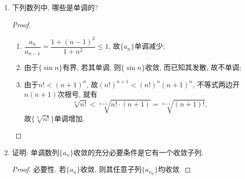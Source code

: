\documentclass[a4paper,11pt,twoside]{ctexbook}
\begin{document}
\begin{enumerate}
\begin{proof}
\begin{equation*}
\begin{split}
				      =&\left(\dfrac{2}{1^2}\right)\left(\dfrac{2\cdot4}{3^2}\right)\left(\dfrac{4\cdot6}{5^2}\right)\cdots\left(\dfrac{(2n-2)(2n)}{(2n-1)^2}\right)\cdot\dfrac{2n}{2n+1}\leqslant2.
			      \end{split}
		      \end{equation*}
		      其中用到了基本不等式$(2n-2)(2n)\leqslant\left(\dfrac{(2n-2)+(2n)}{2}\right)^2=(2n-1)^2$, 即$\dfrac{(2n-2)(2n)}{(2n-1)^2}\leqslant 1$, 于是$\{a_n\}$有上界; 又由
		      \[
			      \dfrac{a_n}{a_{n-1}}=\left(\dfrac{2n}{2n-1}\right)^2\dfrac{2n-1}{2n+1}=\dfrac{4n^2}{4n^2-1}\geqslant 1.
		      \]
		      故$\{a_n\}$单调增加. 由单调有界原理知$\{a_n\}$收敛.\qedhere

	      \end{proof}
	\item 下列数列中, 哪些是单调的?
	      \begin{tabenum}[(1)]
		      \item $\left\{\dfrac{1}{1+n^2}\right\}$; \item $\{\sin{n}\}$;	\item $\{\sqrt[n]{n!}\}$.
	      \end{tabenum}
	      \begin{proof}
		      \begin{enumerate}[(1)]
			      \item $\dfrac{a_n}{a_{n-1}}=\dfrac{1+(n-1)^2}{1+n^2}\leqslant 1$, 故$\{a_n\}$单调减少;
			      \item 由于$\{\sin{n}\}$有界, 若其单调, 则$\{\sin{n}\}$收敛, 而已知其发散, 故不单调;
			      \item 由于$n!<(n+1)^n$, 故$(n!)^{n+1}<(n!)^n(n+1)^n$, 不等式两边开$n(n+1)$次根号, 就有
			            \[
				            \sqrt[n]{n!}<\sqrt[n+1]{n!\cdot (n+1)}=\sqrt[n+1]{(n+1)!},
			            \]
			            故$\{\sqrt[n]{n!}\}$单调增加.\qedhere
		      \end{enumerate}
	      \end{proof}
	\item 证明: 单调数列$\{a_n\}$收敛的充分必要条件是它有一个收敛子列.
	      \begin{proof}
		      必要性. 若$\{a_n\}$收敛, 则其任意子列$\{a_{n_k}\}$均收敛.


\end{proof}
\end{enumerate}
\end{document}
